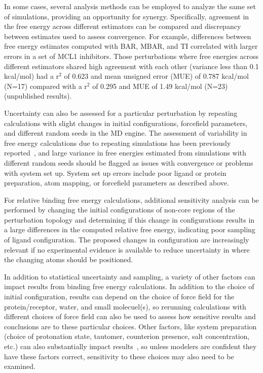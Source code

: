 \documentclass[9pt,bestpractices]{livecoms}
\begin{document}
In some cases, several analysis methods can be employed to analyze the same set of simulations, providing an opportunity for synergy. Specifically, agreement in the free energy across different estimators can be compared and discrepancy between estimates used to assess convergence.
For example, differences between free energy estimates computed with BAR, MBAR, and TI correlated with larger errors in a set of MCL1 inhibitors.
Those perturbations where free energies across different estimators shared high agreement with each other (variance less than 0.1 kcal/mol) had a r$^2$ of 0.623 and mean unsigned error (MUE) of 0.787 kcal/mol (N=17) compared with a r$^2$ of 0.295 and MUE of 1.49 kcal/mol (N=23) (unpublished results).

Uncertainty can also be assessed for a particular perturbation by repeating calculations with slight changes in initial configurations, forcefield parameters, and different random seeds in the MD engine. 
The assessment of variability in free energy calculations due to repeating simulations has been previously reported~\cite{aldeghi2019accurate,paliwal2011benchmark}, and large variance in free energies estimated from simulations with different random seeds should be flagged as issues with convergence or problems with system set up. 
System set up errors include poor ligand or protein preparation, atom mapping, or forcefield parameters as described above.

For relative binding free energy calculations, additional sensitivity analysis can be performed by changing the initial configurations of non-core regions of the perturbation topology and determining if this change in configurations results in a large differences in the computed relative free energy, indicating poor sampling of ligand configuration.
The proposed changes in configuration are increasingly relevant if no experimental evidence is available to reduce uncertainty in where the changing atoms should be positioned.

In addition to statistical uncertainty and sampling, a variety of other factors can impact results from binding free energy calculations. In addition to the choice of initial configuration, results can depend on the choice of force field for the protein/receptor, water, and small molecuel(s), so rerunning calculations with different choices of force field can also be used to assess how sensitive results and conclusions are to these particular choices. Other factors, like system preparation (choice of protonation state, tautomer, counterion presence, salt concentration, etc.) can also substantially impact results~\cite{mobley2017predicting, mobley2017predictingb}, so unless modelers are confident they have these factors correct, sensitivity to these choices may also need to be examined.
\end{document}
